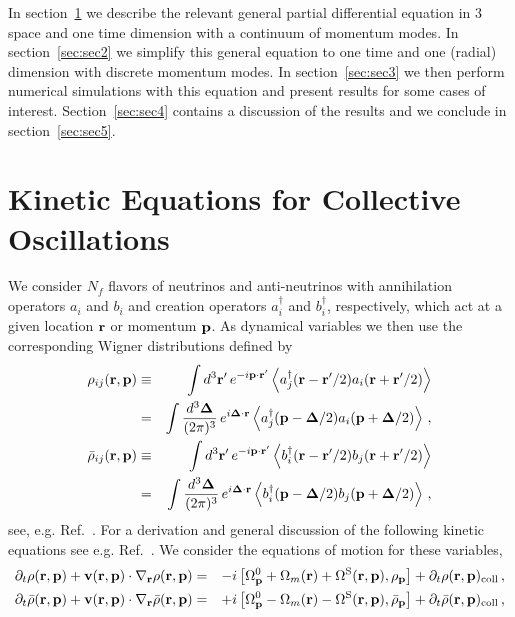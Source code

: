 \documentclass[prd,aps]{revtex4-2}
\begin{document}
In section~\ref{sec:sec1} we describe the relevant general partial differential equation in 3 space and one time dimension
with a continuum of momentum modes. In section~\ref{sec:sec2} we simplify this general equation to
one time and one (radial) dimension with discrete momentum modes. In section~\ref{sec:sec3} we then perform numerical
simulations with this equation and present results for some cases of interest. Section~\ref{sec:sec4} contains a discussion
of the results and we conclude in section~\ref{sec:sec5}.

\section{Kinetic Equations for Collective Oscillations} \label{sec:sec1}
We consider $N_f$ flavors of neutrinos and anti-neutrinos with annihilation operators $a_i$ and $b_i$
and creation operators $a^\dagger_i$ and $b^\dagger_i$, respectively, which act at a given location
${\bf r}$ or momentum ${\bf p}$. As dynamical variables we then use the corresponding Wigner distributions defined by
\begin{eqnarray}
  \rho_{ij}({\bf r},{\bf p})&\equiv&\int d^3{\bf r}^\prime\,e^{-i{\bf p}
  \cdot{\bf r}^\prime}\left\langle a^\dagger_j({\bf r}-{\bf r}^\prime/2)
  a_i({\bf r}+{\bf r}^\prime/2)\right\rangle\nonumber\\
  &=&\int {d^3{\bf\Delta}\over (2\pi)^3}\,e^{i{\bf\Delta}\cdot{\bf r}}
  \left\langle a^\dagger_j({\bf p}-{\bf\Delta}/2)a_i({\bf p}+
  {\bf\Delta}/2)\right\rangle\,,\\
  \bar\rho_{ij}({\bf r},{\bf p})&\equiv&\int d^3{\bf r}^\prime\,e^{-i{\bf p}
  \cdot{\bf r}^\prime}\left\langle b^\dagger_i({\bf r}-{\bf r}^\prime/2)
  b_j({\bf r}+{\bf r}^\prime/2)\right\rangle\nonumber\\
  &=&\int {d^3{\bf\Delta}\over (2\pi)^3}\,e^{i{\bf\Delta}\cdot{\bf r}}
  \left\langle b^\dagger_i({\bf p}-{\bf\Delta}/2)b_j({\bf p}+
  {\bf\Delta}/2)\right\rangle\,,\nonumber
\label{eq:Wigner}
\end{eqnarray}
see, e.g. Ref.~\cite{Stirner:2018ojk}. For a derivation and general discussion of the following kinetic equations see
e.g. Ref.~\cite{Sigl:1993ctk}. We consider the equations of motion for these variables,
\begin{eqnarray}\label{eq:eom1}
 \partial_t \rho({\bf r},{\bf p})+{\bf v}({\bf r},{\bf p})\cdot\nabla_{\bf r}\rho({\bf r},{\bf p})&=&
 -i\left[\Omega^0_{\bf p}+\Omega_m({\bf r})+\Omega^{\rm S}({\bf r},{\bf p})
 ,\rho_{\bf p}\right]+\partial_t \rho({\bf r},{\bf p})_{\rm coll}\,,\\
 \partial_t \bar\rho({\bf r},{\bf p})+{\bf v}({\bf r},{\bf p})\cdot\nabla_{\bf r}\bar\rho({\bf r},{\bf p})&=&
 +i\left[\Omega^0_{\bf p}-\Omega_m({\bf r})-\Omega^{\rm S}({\bf r},{\bf p})
 ,\bar\rho_{\bf p}\right]+\partial_t\bar\rho({\bf r},{\bf p})_{\rm coll}\,,\nonumber
\end{eqnarray}
\end{document}

